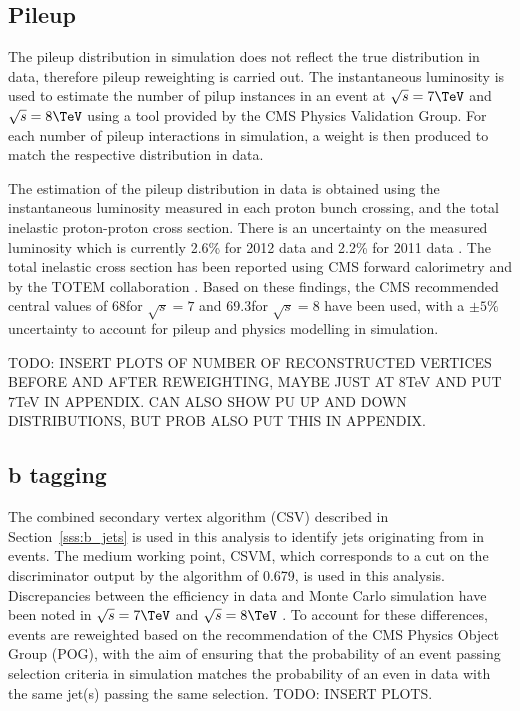 \subsection{Pileup}
\label{ss:pileup}
The pileup distribution in simulation does not reflect the true distribution in data, therefore pileup
reweighting is carried out. The instantaneous luminosity is used to estimate the number of pilup instances in
an event at $\sqrt{s}=7\TeV$ and $\sqrt{s}=8\TeV$ using a tool provided by the CMS Physics Validation Group.
For each number of pileup interactions in simulation, a weight is then produced to match the respective
distribution in data.

The estimation of the pileup distribution in data is obtained using the instantaneous luminosity measured in
each proton bunch crossing, and the total inelastic proton-proton cross section. There is an uncertainty on
the measured luminosity which is currently 2.6\% for 2012 data \cite{CMS:2013gfa} and 2.2\% for 2011 data
\cite{CMS:2012eui}. The total inelastic cross section has been reported using CMS forward calorimetry
\cite{Chatrchyan:2012gwa} and by the TOTEM collaboration \cite{Antchev:2011vs}. Based on these findings, the
CMS recommended central values of 68\mb for $\sqrt{s}=7$ and 69.3\mb for $\sqrt{s}=8$ have been used, with a
$\pm5\%$ uncertainty to account for pileup and physics modelling in simulation.

TODO: INSERT PLOTS OF NUMBER OF RECONSTRUCTED VERTICES BEFORE AND AFTER REWEIGHTING, MAYBE JUST AT 8TeV AND
PUT 7TeV IN APPENDIX. CAN ALSO SHOW PU UP AND DOWN DISTRIBUTIONS, BUT PROB ALSO PUT THIS IN APPENDIX.

\subsection{b tagging}
\label{ss:b_tagging}
The combined secondary vertex \btagging algorithm (CSV) described in Section~\ref{sss:b_jets} is used in this
analysis to identify jets originating from \bquarks in \ttbar events. The medium working point, CSVM, which
corresponds to a cut on the discriminator output by the algorithm of 0.679, is used in this analysis.
Discrepancies between the \btagging efficiency in data and Monte Carlo simulation have been noted in
$\sqrt{s}=7\TeV$ \cite{CMS-PAS-BTV-11-004} and $\sqrt{s}=8\TeV$ \cite{CMS-DP-2013-005}. To account for these
differences, events are reweighted based on the recommendation of the CMS \btagging Physics Object Group
(POG), with the aim of ensuring that the probability of an event passing selection criteria in simulation
matches the probability of an even in data with the same jet(s) passing the same selection. TODO: INSERT
PLOTS.

